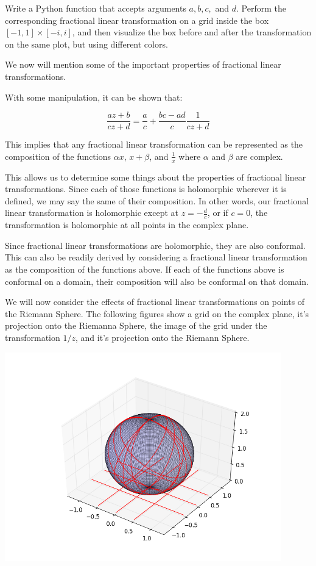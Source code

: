 \begin{problem} Write a Python function that accepts arguments $a,b,c,$ and $d$. Perform the corresponding fractional linear transformation on a grid inside the box $[-1,1]\times[-i,i]$, and then visualize the box before and after the transformation on the same plot, but using different colors.
\end{problem}

We now will mention some of the important properties of fractional linear transformations.

With some manipulation, it can be shown that:

$$\frac{az+b}{cz+d}=\frac{a}{c}+\frac{bc-ad}{c} \frac{1}{cz+d}$$

This implies that any fractional linear transformation can be represented as the composition of the functions $\alpha x$, $x+\beta$, and $\frac{1}{x}$ where $\alpha$ and $\beta$ are complex. 

This allows us to determine some things about the properties of fractional linear transformations. Since each of those functions is holomorphic wherever it is defined, we may say the same of their composition. In other words, our fractional linear transformation is holomorphic except at $z=-\frac{d}{c}$, or if $c=0$, the transformation is holomorphic at all points in the complex plane. 

Since fractional linear transformations are holomorphic, they are also conformal. This can also be readily derived by considering a fractional linear transformation as the composition of the functions above. If each of the functions above is conformal on a domain, their composition will also be conformal on that domain. 

We will now consider the effects of fractional linear transformations on points of the Riemann Sphere. The following figures show a grid on the complex plane, it's projection onto the Riemanna Sphere, the image of the grid under the transformation $1/z$, and it's projection onto the Riemann Sphere. 

\includegraphics[width=120mm]{mobius2.png}

